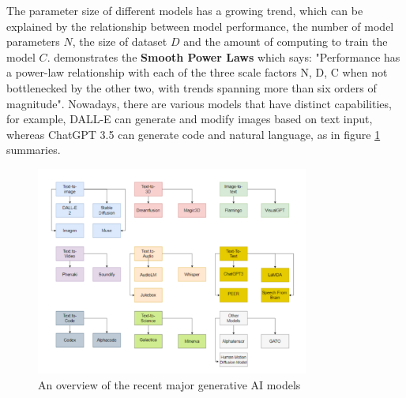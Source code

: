 \documentclass[runningheads]{llncs}
\begin{document}
\noindent
The parameter size of different models has a growing trend, which can be explained by the relationship between model performance, the number of model parameters $N$, the size of dataset $D$ and the amount of computing to train the model $C$. \cite{Kaplan20} demonstrates the \textbf{Smooth Power Laws} which says:
"Performance has a power-law relationship with each of the three scale factors N, D, C when not bottlenecked by the other two, with trends spanning more than six orders of magnitude". Nowadays, there are various models
that have distinct capabilities, for example, DALL-E can generate and modify images based on text input, whereas ChatGPT 3.5 can generate code and natural language, as \cite{Gozalo23} in figure \ref{fig:model_overview} summaries.
\noindent \newline
\begin{figure}[H]
  \centering
  \includegraphics[width=0.8\textwidth]{models overview.png}
  \caption{An overview of the recent major generative AI models  \cite{Gozalo23}}
  \label{fig:model_overview}
\end{figure} 
\end{document}
